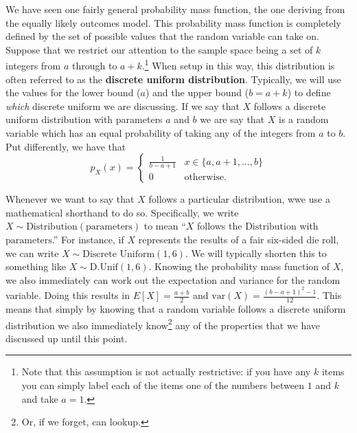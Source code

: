 \documentclass[
  letterpaper,
  DIV=11,
  numbers=noendperiod]{scrreprt}
\theoremstyle{definition}
\theoremstyle{definition}
\theoremstyle{definition}
\theoremstyle{remark}
\begin{document}
We have seen one fairly general probability mass function, the one
deriving from the equally likely outcomes model. This probability mass
function is completely defined by the set of possible values that the
random variable can take on. Suppose that we restrict our attention to
the sample space being a set of \(k\) integers from \(a\) through to
\(a+k\).\footnote{Note that this assumption is not actually restrictive:
  if you have any \(k\) items you can simply label each of the items one
  of the numbers between \(1\) and \(k\) and take \(a=1\).} When setup
in this way, this distribution is often referred to as the
\textbf{discrete uniform distribution}. Typically, we will use the
values for the lower bound (\(a\)) and the upper bound (\(b=a+k\)) to
define \emph{which} discrete uniform we are discussing. If we say that
\(X\) follows a discrete uniform distribution with parameters \(a\) and
\(b\) we are say that \(X\) is a random variable which has an equal
probability of taking any of the integers from \(a\) to \(b\). Put
differently, we have that
\[p_X(x) = \begin{cases} \frac{1}{b-a+1} & x \in\{a,a+1,\dots,b\}\\ 0 & \text{otherwise}.\end{cases}\]

Whenever we want to say that \(X\) follows a particular distribution,
wwe use a mathematical shorthand to do so. Specifically, we write
\(X \sim \text{Distribution}(\text{parameters})\) to mean ``\(X\)
follows the \(\text{Distribution}\) with \(\text{parameters}\).'' For
instance, if \(X\) represents the results of a fair six-sided die roll,
we can write \(X\sim\text{Discrete Uniform}(1,6)\). We will typically
shorten this to something like \(X\sim\text{D.Unif}(1,6)\). Knowing the
probability mass function of \(X\), we also immediately can work out the
expectation and variance for the random variable. Doing this results in
\(E[X] = \frac{a+b}{2}\) and \(\text{var}(X) = \frac{(b-a+1)^2-1}{12}\).
This means that simply by knowing that a random variable follows a
discrete uniform distribution we also immediately know\footnote{Or, if
  we forget, can lookup.} any of the properties that we have discussed
up until this point.
\end{document}
